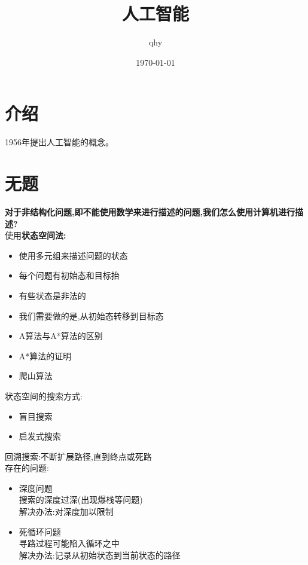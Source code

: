\documentclass[UTF8,a4paper]{ctexart}
\author{ qhy }
\date{\today}
\title{人工智能}
\begin{document}
  \maketitle
  \tableofcontents
  \newpage

  \section{介绍}
  1956年提出人工智能的概念。

  \section{无题}
  \textbf{对于非结构化问题,即不能使用数学来进行描述的问题,我们怎么使用计算机进行描述?}\\
  使用\textbf{状态空间法:}
  \begin{itemize}
    \item 使用多元组来描述问题的状态
    \item 每个问题有初始态和目标抬
    \item 有些状态是非法的
    \item 我们需要做的是,从初始态转移到目标态
  \end{itemize}

  \begin{itemize}
    \item A算法与A*算法的区别
    \item A*算法的证明
    \item 爬山算法
  \end{itemize}

  状态空间的搜索方式:
  \begin{itemize}
    \item 盲目搜索
    \item 启发式搜索
  \end{itemize}

  回溯搜索:不断扩展路径,直到终点或死路\\
  存在的问题:
  \begin{itemize}
    \item 深度问题\\
    搜索的深度过深(出现爆栈等问题)\\
    解决办法:对深度加以限制
    \item 死循环问题\\
    寻路过程可能陷入循环之中\\
    解决办法:记录从初始状态到当前状态的路径
  \end{itemize}
\end{document}
